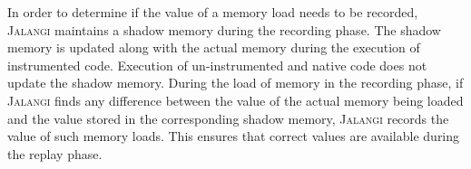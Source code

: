 \documentclass{sig-alternate}
\def\jalangi{\textsc{Jalangi}}
\begin{document}

In order to determine if the value of a memory load needs to be
recorded, \jalangi{} maintains a shadow memory during the recording
phase.  The shadow memory is updated along with the actual memory
during the execution of instrumented code.  Execution of
un-instrumented and native code does not update the shadow memory.
During the load of memory in the recording phase, if \jalangi{} finds
any difference between the value of the actual memory being loaded and
the value stored in the corresponding shadow memory, \jalangi{}
records the value of such memory loads. This ensures that correct
values are available during the replay phase.
\end{document}
